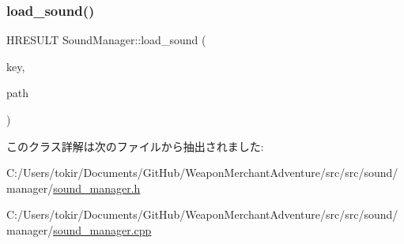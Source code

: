 \mbox{\label{class_sound_manager_a0a2e4248f9ca4654d672342750b73fb3}} 
\subsubsection{\texorpdfstring{load\+\_\+sound()}{load\_sound()}}
{\footnotesize\ttfamily H\+R\+E\+S\+U\+LT Sound\+Manager\+::load\+\_\+sound (\begin{DoxyParamCaption}\item[{const std\+::string \&}]{key,  }\item[{const W\+C\+H\+AR $\ast$}]{path }\end{DoxyParamCaption})}



このクラス詳解は次のファイルから抽出されました\+:\begin{DoxyCompactItemize}
\item 
C\+:/\+Users/tokir/\+Documents/\+Git\+Hub/\+Weapon\+Merchant\+Adventure/src/src/sound/manager/\mbox{\hyperlink{sound__manager_8h}{sound\+\_\+manager.\+h}}\item 
C\+:/\+Users/tokir/\+Documents/\+Git\+Hub/\+Weapon\+Merchant\+Adventure/src/src/sound/manager/\mbox{\hyperlink{sound__manager_8cpp}{sound\+\_\+manager.\+cpp}}\end{DoxyCompactItemize}
